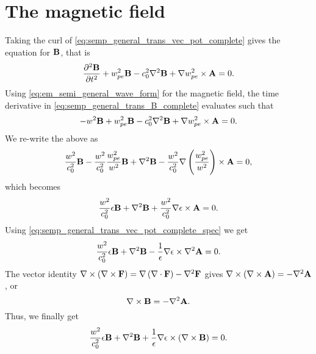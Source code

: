 \documentclass[a4paper,11pt]{report}
\begin{document}
\section{The magnetic field}
Taking the curl of \cref{eq:semp_general_trans_vec_pot_complete} gives the equation for $\mathbf{B}$, that is
\begin{equation}
    \label{eq:semp_general_trans_B_complete}
    \frac{\partial^2 \mathbf{B}}{\partial t^2} + w_{pe}^2 \mathbf{B} - c_0^2 \nabla^2 \mathbf{B} + \nabla w_{pe}^2 \times \mathbf{A} = 0.
\end{equation}
Using \cref{eq:em_semi_general_wave_form} for the magnetic field, the time derivative in \cref{eq:semp_general_trans_B_complete} evaluates such that 
\begin{equation*}
    -w^2 \mathbf{B} + w_{pe}^2 \mathbf{B} - c_0^2 \nabla^2 \mathbf{B} + \nabla w_{pe}^2 \times \mathbf{A} = 0.
\end{equation*}
We re-write the above as
\begin{equation*}
    \frac{w^2}{c_0^2} \mathbf{B} - \frac{w^2}{c_0^2} \frac{w_{pe}^2}{w^2} \mathbf{B} + \nabla^2 \mathbf{B} - \frac{w^2}{c_0^2} \nabla \left ( \frac{w_{pe}^2}{w^2} \right ) \times \mathbf{A} = 0,
\end{equation*}
which becomes
\begin{equation*}
    \frac{w^2}{c_0^2} \epsilon \mathbf{B} + \nabla^2 \mathbf{B} + \frac{w^2}{c_0^2} \nabla \epsilon \times \mathbf{A} = 0.
\end{equation*}
Using \cref{eq:semp_general_trans_vec_pot_complete_spec} we get 
\begin{equation*}
    \frac{w^2}{c_0^2} \epsilon \mathbf{B} + \nabla^2 \mathbf{B} - \frac{1}{\epsilon} \nabla \epsilon \times \nabla^2 \mathbf{A} = 0.
\end{equation*}
The vector identity $\nabla \times \left ( \nabla \times \mathbf{F} \right ) = \nabla \left ( \nabla \cdot \mathbf{F} \right ) - \nabla^2 \mathbf{F}$ gives $\nabla \times \left ( \nabla \times \mathbf{A} \right ) = -\nabla^2 \mathbf{A} $, or
\begin{equation}
    \label{eq:semp_b_to_a_vec_identity}
    \nabla \times \mathbf{B} = -\nabla^2 \mathbf{A}.
\end{equation}
Thus, we finally get
\begin{equation}
    \label{eq:semp_general_trans_B_complete_spec}
    \frac{w^2}{c_0^2} \epsilon \mathbf{B} + \nabla^2 \mathbf{B} + \frac{1}{\epsilon} \nabla \epsilon \times \left ( \nabla \times \mathbf{B} \right ) = 0.
\end{equation}
\end{document}
